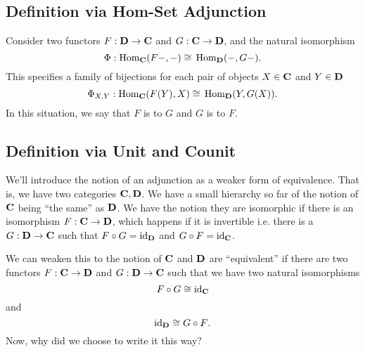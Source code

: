 
\subsection{Definition via Hom-Set Adjunction}

Consider two functors $F:\mathbf{D}\to\mathbf{C}$ and
$G:\mathbf{C}\to\mathbf{D}$, and the natural isomorphism
\begin{equation}%
\Phi:\hom_{\ms{C}}(F-,-)\cong{}\hom_{\ms{D}}(-,G-).
\end{equation}
This specifies a family of bijections for each pair of objects
$X\in\mathbf{C}$ and $Y\in\mathbf{D}$ 
\begin{equation}%
\Phi_{X,Y}:\hom_{\ms{C}}(F(Y),X)\cong{}\hom_{\ms{D}}(Y,G(X)).
\end{equation}
In this situation, we say that $F$ is  to
$G$ and $G$ is  to $F$.

\subsection{Definition via Unit and Counit}

We'll introduce the notion of an adjunction as a weaker form of
equivalence. That is, we have two categories $\mathbf{C},\mathbf{D}$. We
have a small hierarchy so far of the notion of $\mathbf{C}$ being
``the same'' as $\mathbf{D}$. We have the notion they are isomorphic
if there is an isomorphism $F:\mathbf{C}\to\mathbf{D}$, which happens if
it is invertible i.e. there is a $G:\mathbf{D}\to\mathbf{C}$ such that
$F\circ{G}=\operatorname{id}_{\mathbf{D}}$ and $G\circ{F}=\operatorname{id}_{\mathbf{C}}$.

We can weaken this to the notion of $\mathbf{C}$ and $\mathbf{D}$ are
``equivalent'' if there are two functors $F:\mathbf{C}\to\mathbf{D}$ and
$G:\mathbf{D}\to\mathbf{C}$ such that we have two natural isomorphisms
\begin{equation}%
F\circ{G}\cong{\id{\ms{C}}}
\end{equation}
and
\begin{equation}%
\id{\ms{D}}\cong{G\circ{F}}.
\end{equation}
Now, why did we choose to write it this way?

